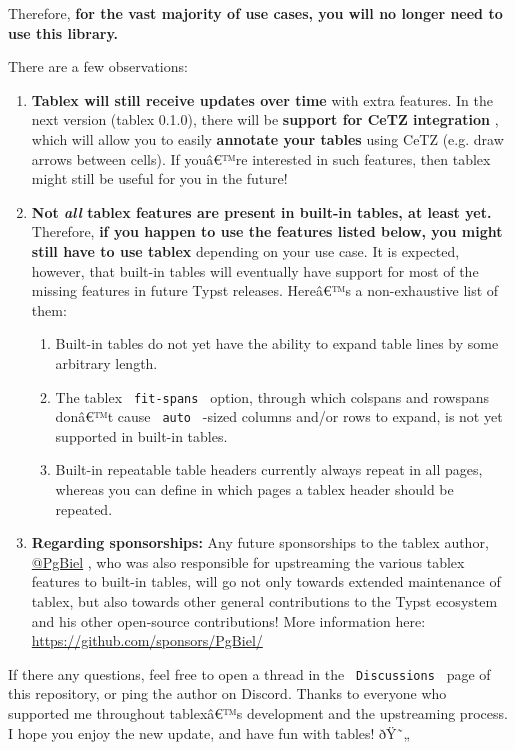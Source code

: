 Therefore, \textbf{for the vast majority of use cases, you will no
longer need to use this library.}

There are a few observations:

\begin{enumerate}
\tightlist
\item
  \textbf{Tablex will still receive updates over time} with extra
  features. In the next version (tablex 0.1.0), there will be
  \textbf{support for CeTZ integration} , which will allow you to easily
  \textbf{annotate your tables} using CeTZ (e.g. draw arrows between
  cells). If youâ€™re interested in such features, then tablex might
  still be useful for you in the future!
\item
  \textbf{Not \emph{all} tablex features are present in built-in tables,
  at least yet.} Therefore, \textbf{if you happen to use the features
  listed below, you might still have to use tablex} depending on your
  use case. It is expected, however, that built-in tables will
  eventually have support for most of the missing features in future
  Typst releases. Hereâ€™s a non-exhaustive list of them:

  \begin{enumerate}
  \tightlist
  \item
    Built-in tables do not yet have the ability to expand table lines by
    some arbitrary length.
  \item
    The tablex \texttt{\ fit-spans\ } option, through which colspans and
    rowspans donâ€™t cause \texttt{\ auto\ } -sized columns and/or rows
    to expand, is not yet supported in built-in tables.
  \item
    Built-in repeatable table headers currently always repeat in all
    pages, whereas you can define in which pages a tablex header should
    be repeated.
  \end{enumerate}
\item
  \textbf{Regarding sponsorships:} Any future sponsorships to the tablex
  author, \href{https://github.com/PgBiel}{@PgBiel} , who was also
  responsible for upstreaming the various tablex features to built-in
  tables, will go not only towards extended maintenance of tablex, but
  also towards other general contributions to the Typst ecosystem and
  his other open-source contributions! More information here:
  \url{https://github.com/sponsors/PgBiel/}
\end{enumerate}

If there any questions, feel free to open a thread in the
\texttt{\ Discussions\ } page of this repository, or ping the author on
Discord. Thanks to everyone who supported me throughout tablexâ€™s
development and the upstreaming process. I hope you enjoy the new
update, and have fun with tables! ðŸ˜„

